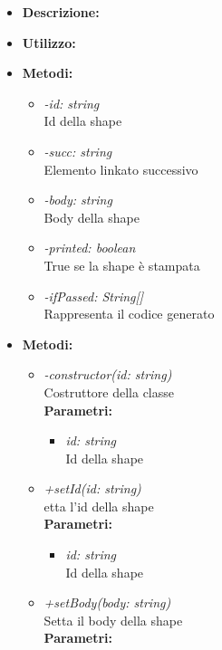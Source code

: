 \begin{itemize}
	\item \textbf{Descrizione:}\\
	
	\item \textbf{Utilizzo:}\\
	
	\item \textbf{Metodi:}
		\begin{itemize}
			\item \emph{-id: string}\\
    		Id della shape
    		\item \emph{-succ: string}\\
    		Elemento linkato successivo
    		\item \emph{-body: string}\\
    		Body della shape
    		\item \emph{-printed: boolean}\\
    		True se la shape è stampata
    		\item \emph{-ifPassed: String[]}\\
    		Rappresenta il codice generato
		\end{itemize}
	\item \textbf{Metodi:}
		\begin{itemize}
			\item \emph{-constructor(id: string)}\\
    		Costruttore della classe\\
    		\textbf{Parametri:}
    		\begin{itemize}
    			\item \emph{id: string}\\
    			Id della shape
    		\end{itemize}
    		\item \emph{+setId(id: string)}\\
    		etta l'id della shape\\
    		\textbf{Parametri:}
    		\begin{itemize}
    			\item \emph{id: string}\\
    			Id della shape
    		\end{itemize}
    		\item \emph{+setBody(body: string)}\\
    		Setta il body della shape\\
    		\textbf{Parametri:}
    		\begin{itemize}

\end{itemize}
\end{itemize}
\end{itemize}
